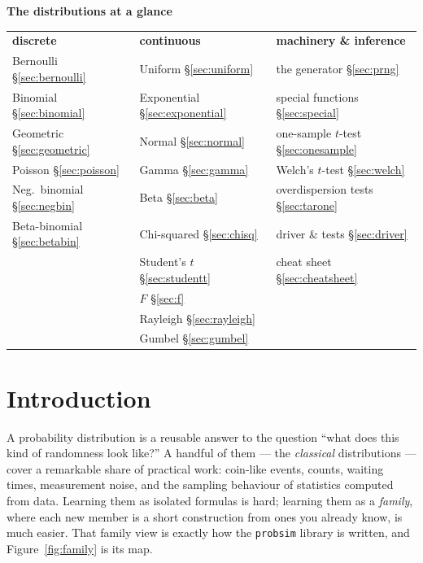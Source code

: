\documentclass[11pt]{article}
\numberwithin{equation}{section}
\begin{document}
\begin{center}
{\normalsize\textbf{The distributions at a glance}}\\[6pt]
{\small\sffamily
\begin{tabular}{lll}
\textcolor{sGreen}{\textbf{discrete}} &
\textcolor{sBlue}{\textbf{continuous}} &
\textcolor{inkS}{\textbf{machinery \& inference}} \\[2pt]
Bernoulli \S\ref{sec:bernoulli}      & Uniform \S\ref{sec:uniform}         & the generator \S\ref{sec:prng} \\
Binomial \S\ref{sec:binomial}        & Exponential \S\ref{sec:exponential} & special functions \S\ref{sec:special} \\
Geometric \S\ref{sec:geometric}      & Normal \S\ref{sec:normal}           & one-sample $t$-test \S\ref{sec:onesample} \\
Poisson \S\ref{sec:poisson}          & Gamma \S\ref{sec:gamma}             & Welch's $t$-test \S\ref{sec:welch} \\
Neg.\ binomial \S\ref{sec:negbin}    & Beta \S\ref{sec:beta}               & overdispersion tests \S\ref{sec:tarone} \\
Beta-binomial \S\ref{sec:betabin}    & Chi-squared \S\ref{sec:chisq}       & driver \& tests \S\ref{sec:driver} \\
                                     & Student's $t$ \S\ref{sec:studentt}  & cheat sheet \S\ref{sec:cheatsheet} \\
                                     & $F$ \S\ref{sec:f}                   & \\
                                     & Rayleigh \S\ref{sec:rayleigh}       & \\
                                     & Gumbel \S\ref{sec:gumbel}           & \\
\end{tabular}}
\end{center}
\bigskip

\section{Introduction}\label{sec:intro}

A probability distribution is a reusable answer to the question ``what does
this kind of randomness look like?''  A handful of them --- the
\emph{classical} distributions --- cover a remarkable share of practical
work: coin-like events, counts, waiting times, measurement noise, and the
sampling behaviour of statistics computed from data.  Learning them as
isolated formulas is hard; learning them as a \emph{family}, where each new
member is a short construction from ones you already know, is much easier.
That family view is exactly how the \texttt{probsim} library is written,
and Figure~\ref{fig:family} is its map.
\end{document}
